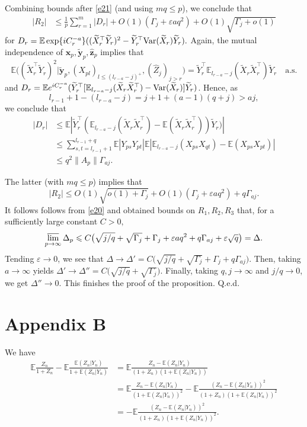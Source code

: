\documentclass[12pt, a4paper]{article}
\newcommand\x{\mathbf x}
\newcommand\z{{\mathbf z}}
\newcommand\y{{\mathbf y}}
\newcommand\wh{\widehat }
\newcommand\wt{\widetilde }
\newcommand\e{{\mathbb E}}
\newcommand\var{{\rm Var}}
\begin{document}
Combining bounds after \eqref{e21} (and using $mq\leqslant p$), we conclude that 
\begin{align*}
|R_2|&\leqslant \frac{1}{p}\sum_{r=1}^m |D_r|+O(1)(\Gamma_j+\varepsilon aq^2)+O(1)\sqrt{\Gamma_j+o(1)}
\end{align*}
for $D_r=\e \exp\{i C_r^{-a}\}( (\wt X_r^\top \wt Y_r)^2- \wt Y_r^\top \var(\wt X_r)\wt Y_r).$
Again, the mutual independence of  $\x_p,\wt \y_p,\wh \z_p$ implies that 
\[\e\big((\wt X_r^\top \wt Y_r)^2\big| \wt\y_p,(X_{pl})_{l\leqslant (l_{r-a}-j)^+}, (\wh Z_j)_{j>r}\big)=\wt Y_r^\top \e_{l_{r-a}-j}(\wt X_r \wt X_r^\top) \wt Y_r\quad\text{a.s.}\]
and $D_r=\e e^{i C_r^{-a}}( \wt Y_r^\top [\e_{l_{r-a}-j}(\wt X_r \wt X_r^\top)- \var(\wt X_r)]\wt Y_r)$. Hence, as \[l_{r-1}+1-(l_{r-a}-j)=j+1+(a-1)(q+j)>aj,\]
we conclude that 
\begin{align*}
|D_r|&\leqslant \e | \wt Y_r^\top (\e_{l_{r-a}-j}(\wt X_r \wt X_r^\top)- \e (\wt X_r \wt X_r^\top) )\wt Y_r)|\\
&\leqslant \sum_{s,t=l_{r-1}+1}^{l_{r-1}+q} \e | Y_{ps}Y_{pt}|\e|\e_{l_{r-a}-j} (  X_{ps}   X_{qt} ) - \e ( X_{ps}  X_{pt} ) |\\&\leqslant q^2\|A_p\| \Gamma_{aj}.
\end{align*}

The latter (with $mq\leqslant p$)  implies that 
\[|R_2|\leqslant O(1)\sqrt{ o(1)+\Gamma_j}+O(1)(\Gamma_j+\varepsilon aq^2) +q\Gamma_{aj}. \]
 It follows follows from  \eqref{e20} and obtained bounds on $R_1,R_2,R_3$  that, for a sufficiently large constant $C>0,$
 \[\varlimsup_{p\to \infty} \Delta_p\leqslant  C\big(\sqrt{j/q}+\sqrt{ \Gamma_j}+\Gamma_j+\varepsilon aq^2 +q\Gamma_{aj}+\varepsilon\sqrt{q}\big)=\Delta.\]
 Tending $\varepsilon\to 0$, we see that $\Delta\to \Delta'=  C\big(\sqrt{j/q}+\sqrt{ \Gamma_j}+\Gamma_j+q\Gamma_{aj}\big)$. Then, taking $a\to\infty$ yields $\Delta'\to\Delta''=  C\big(\sqrt{j/q}+\sqrt{ \Gamma_j}\big)$. Finally, taking $q,j\to\infty$ and $j/q\to 0$, we get 
 $\Delta''\to0$. This finishes the proof of the proposition. Q.e.d.
  
\section*{Appendix B}

 We have
\begin{align}
\label{e5}
\e \frac{Z_n}{1+Z_n}-\e\frac{\e (Z_n|Y_n)}{1+\e (Z_n|Y_n)}&=\e \frac{Z_n-\e( Z_n|Y_n)}{(1+Z_n)(1+\e (Z_n|Y_n))}\nonumber\\
&=\e \frac{Z_n-\e(Z_n|Y_n)}{(1+\e(Z_n|Y_n))^2}-\e \frac{(Z_n-\e( Z_n|Y_n))^2}{(1+Z_n)(1+\e (Z_n|Y_n))^2}\nonumber\\
&=-\e \frac{(Z_n-\e( Z_n|Y_n))^2}{(1+Z_n)(1+\e (Z_n|Y_n))^2}.
\end{align}
\end{document}
